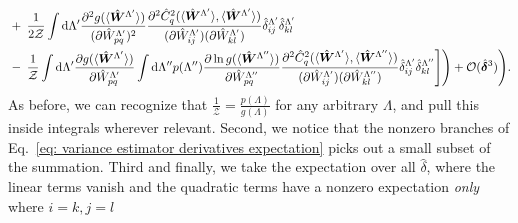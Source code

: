 \documentclass[%
 reprint,
 amsmath,amssymb,
 aps,nofootinbib,nobibnotes,onecolumn,prd
]{revtex4-2}
\begin{document}
\begin{align}
&+
\left.\left.
\frac{1}{2\mathcal{Z}} \int {\rm d}\Lambda' \frac{\partial^2g(\langle \hat{\bm W}^{\Lambda'}\rangle)}{(\partial \hat{W}^{\Lambda'}_{pq})^2}\frac{\partial^2\hat{C}^2_q(\langle \hat{\bm W}^{\Lambda'}\rangle, \langle \hat{\bm W}^{\Lambda'}\rangle)}{(\partial \hat{W}_{ij}^{\Lambda'})(\partial \hat{W}_{kl}^{\Lambda'})}\hat{\delta}_{ij}^{\Lambda'}\hat{\delta}_{kl}^{\Lambda'} \nonumber \right.\right. \\ 
&- 
\left.\left. \frac{1}{\mathcal{Z}}\int {\rm d}\Lambda' \frac{\partial g(\langle \hat{\bm W}^{\Lambda'}\rangle)}{\partial \hat{W}^{\Lambda'}_{pq}}\int {\rm d}{\Lambda''} p(\Lambda'') \frac{\partial \ln g(\langle \hat{\bm W}^{\Lambda''}\rangle)}{\partial \hat{W}^{\Lambda''}_{pq}}\frac{\partial^2 \hat{C}^2_q(\langle \hat{\bm W}^{\Lambda'}\rangle, \langle \hat{\bm W}^{\Lambda''}\rangle)}{(\partial \hat{W}_{ij}^{\Lambda'})(\partial \hat{W}_{kl}^{\Lambda''})}\hat{\delta}_{ij}^{\Lambda'}\hat{\delta}_{kl}^{\Lambda''}
\right]\right)
+
\mathcal{O}(\hat{\bm \delta}^3)\Bigg).
\end{align}
As before, we can recognize that $\frac{1}{\mathcal{Z}} = \frac{p(\Lambda)}{g(\Lambda)}$ for any arbitrary $\Lambda$, and pull this inside integrals wherever relevant. Second, we notice that the nonzero branches of Eq.~\ref{eq: variance estimator derivatives expectation} picks out a small subset of the summation. Third and finally, we take the expectation over all $\hat{\delta}$, where the linear terms vanish and the quadratic terms have a nonzero expectation \textit{only} where $i=k, j=l$
\end{document}
